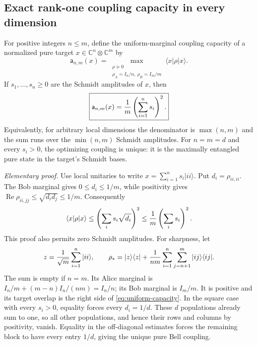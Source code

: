 \subsection{Exact rank-one coupling capacity in every dimension}

For positive integers $n\le m$, define the uniform-marginal coupling capacity
of a normalized pure target $x\in\mathbb C^n\otimes\mathbb C^m$ by
\[
 \mathsf a_{n,m}(x)=\max_{\substack{\rho\succeq0\\
                     \rho_A=I_n/n,\ \rho_B=I_m/m}}
                   \langle x|\rho|x\rangle.
\]
If $s_1,\ldots,s_n\ge0$ are the Schmidt amplitudes of $x$, then
\begin{equation}\label{eq:uniform-capacity}
 \boxed{\mathsf a_{n,m}(x)={1\over m}\left(\sum_{i=1}^n s_i\right)^2.}
\end{equation}
Equivalently, for arbitrary local dimensions the denominator is
$\max(n,m)$ and the sum runs over the $\min(n,m)$ Schmidt amplitudes.
For $n=m=d$ and every $s_i>0$, the optimizing coupling is unique:
it is the maximally entangled pure state in the target's Schmidt bases.

\emph{Elementary proof.} Use local unitaries to write
$x=\sum_{i=1}^n s_i|ii\rangle$. Put $d_i=\rho_{ii,ii}$.
The Bob marginal gives $0\le d_i\le1/m$, while positivity gives
$\operatorname{Re}\rho_{ii,jj}\le\sqrt{d_i d_j}\le1/m$.
Consequently
\[
 \langle x|\rho|x\rangle
   \le\left(\sum_i s_i\sqrt{d_i}\right)^2
   \le {1\over m}\left(\sum_i s_i\right)^2.
\]
This proof also permits zero Schmidt amplitudes. For sharpness, let
\[
 z={1\over\sqrt m}\sum_{i=1}^n|ii\rangle,\qquad
 \rho_*=|z\rangle\langle z|+
        {1\over nm}\sum_{i=1}^n\sum_{j=n+1}^m|ij\rangle\langle ij|.
\]
The sum is empty if $n=m$. Its Alice marginal is
$I_n/m+(m-n)I_n/(nm)=I_n/n$; its Bob marginal is $I_m/m$.
It is positive and its target overlap is the right side of
\eqref{eq:uniform-capacity}. In the square case with every $s_i>0$,
equality forces every $d_i=1/d$. These $d$ populations already sum to one,
so all other populations, and hence their rows and columns by positivity,
vanish. Equality in the off-diagonal estimates forces the remaining block
to have every entry $1/d$, giving the unique pure Bell coupling.

